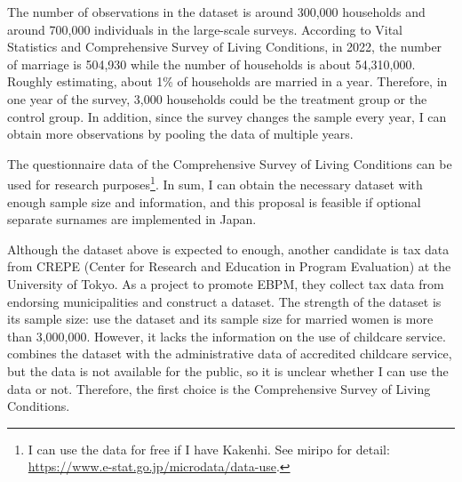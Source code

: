 \documentclass[12pt]{article}
\begin{document}
The number of observations in the dataset is around 300,000 households and around 700,000 individuals in the large-scale surveys.
According to Vital Statistics and Comprehensive Survey of Living Conditions, in 2022, the number of marriage is 504,930 while the number of households is about 54,310,000. 
Roughly estimating, about 1\% of households are married in a year.
Therefore, in one year of the survey, 3,000 households could be the treatment group or the control group. 
In addition, since the survey changes the sample every year, I can obtain more observations by pooling the data of multiple years.


The questionnaire data of the Comprehensive Survey of Living Conditions can be used for research purposes\footnote{
  I can use the data for free if I have Kakenhi. 
  See miripo for detail: \url{https://www.e-stat.go.jp/microdata/data-use}.
}.
In sum, I can obtain the necessary dataset with enough sample size and information, and this proposal is feasible if optional separate surnames are implemented in Japan.


Although the dataset above is expected to enough, another candidate is tax data from CREPE (Center for Research and Education in Program Evaluation) at the University of Tokyo.
As a project to promote EBPM, they collect tax data from endorsing municipalities and construct a dataset. 
The strength of the dataset is its sample size: \cite[Kondo and Fukai]{kondo2023} use the dataset and its sample size for married women is more than 3,000,000. 
However, it lacks the information on the use of childcare service. 
\cite{kondo2024} combines the dataset with the administrative data of accredited childcare service, but the data is not available for the public, so it is unclear whether I can use the data or not.
Therefore, the first choice is the Comprehensive Survey of Living Conditions.



\nocite{*}


\end{document}
